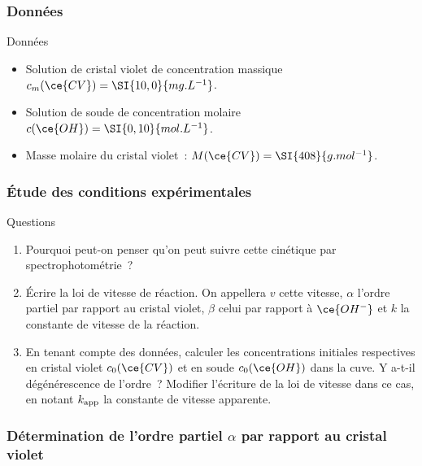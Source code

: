 \documentclass[a4paper, 11pt, final, garamond]{book}
\begin{document}
\subsubsection{Données}

\begin{rdefi}{Données}
    \begin{itemize}
        \item Solution de cristal violet de concentration massique
            $c_{m}(\ce{CV}) = \SI{10,0}{mg.L^{-1}}$.
        \item Solution de soude de concentration molaire $c(\ce{OH}) =
            \SI{0,10}{mol.L^{-1}}$.
        \item Masse molaire du cristal violet~: $M(\ce{CV}) =
            \SI{408}{g.mol^{-1}}$.
    \end{itemize}
\end{rdefi}

\subsubsection{Étude des conditions expérimentales}

\begin{rexem}{Questions}
    \begin{enumerate}[label*=\protect\fbox{\arabic{enumi}}]
        \item Pourquoi peut-on penser qu'on peut suivre cette cinétique par
            spectrophotométrie~?
        \item Écrire la loi de vitesse de réaction. On appellera $v$ cette
            vitesse, $\alpha$ l'ordre partiel par rapport au cristal violet,
            $\beta$ celui par rapport à $\ce{OH^-}$ et $k$ la constante de
            vitesse de la réaction.
        \item En tenant compte des données, calculer les concentrations
            initiales respectives en cristal violet $c_0(\ce{CV})$ et en soude
            $c_0(\ce{OH})$ dans la cuve. Y a-t-il dégénérescence de l'ordre~?
            Modifier l'écriture de la loi de vitesse dans ce cas, en notant
            $k_{\rm app}$ la constante de vitesse apparente.
    \end{enumerate}
\end{rexem}

\subsubsection{Détermination de l'ordre partiel $\alpha$ par rapport au cristal
violet}
\end{document}
